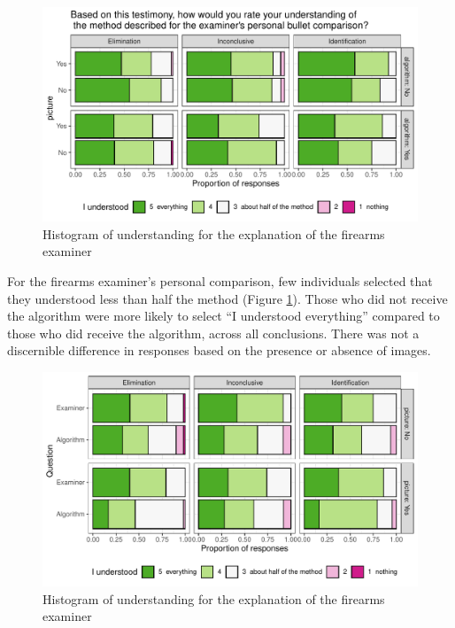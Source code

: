 \documentclass[print]{nuthesis}
\begin{document}
\begin{figure}

{\centering \includegraphics[width=\linewidth]{thesis_files/figure-latex/expunder-1} 

}

\caption{Histogram of understanding for the explanation of the firearms examiner}\label{fig:expunder}
\end{figure}

For the firearms examiner's personal comparison, few individuals selected that they understood less than half the method (Figure \ref{fig:expunder}).
Those who did not receive the algorithm were more likely to select ``I understood everything'' compared to those who did receive the algorithm, across all conclusions.
There was not a discernible difference in responses based on the presence or absence of images.

\begin{figure}

{\centering \includegraphics[width=\linewidth]{thesis_files/figure-latex/allunder-1} 

}

\caption{Histogram of understanding for the explanation of the firearms examiner}\label{fig:allunder}
\end{figure}
\end{document}
